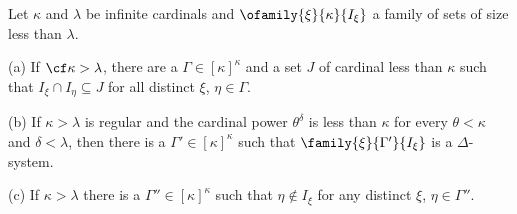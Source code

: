 Let $\kappa$ and $\lambda$ be infinite cardinals
and $\ofamily{\xi}{\kappa}{I_{\xi}}$ a family of
sets of size less than $\lambda$.

(a) If $\cf\kappa>\lambda$, there are a
$\Gamma\in[\kappa]^{\kappa}$ and a set $J$ of
cardinal less than $\kappa$ such that $I_{\xi}\cap I_{\eta}\subseteq J$
for all distinct $\xi$, $\eta\in\Gamma$.

(b) If $\kappa>\lambda$ is regular and
the cardinal power $\theta^{\delta}$ is less than $\kappa$ for every
$\theta<\kappa$ and $\delta<\lambda$, then
there is a $\Gamma'\in[\kappa]^{\kappa}$ such
that $\family{\xi}{\Gamma'}{I_{\xi}}$ is a $\Delta$-system.

(c) If $\kappa>\lambda$ there is a $\Gamma''\in[\kappa]^{\kappa}$ such
that $\eta\notin I_{\xi}$ for any distinct $\xi$, $\eta\in\Gamma''$.


